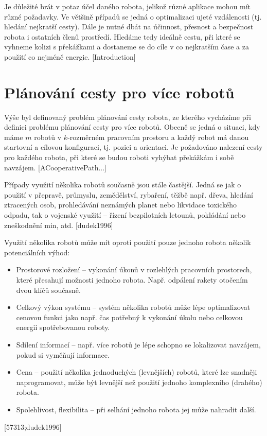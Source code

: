 Je důležité brát v potaz účel daného robota, jelikož různé aplikace mohou mít různé požadavky. Ve většině případů se jedná o optimalizaci ujeté vzdálenosti (tj. hledání nejkratší cesty). Dále je nutné dbát na účinnost, přesnost a bezpečnost robota i ostatních členů prostředí. Hledáme tedy ideálně cestu, při které se vyhneme kolizi s překážkami a dostaneme se do cíle v co nejkratším čase a za použití co nejméně energie. [Introduction]



\section{Plánování cesty pro více robotů}
Výše byl definovaný problém plánování cesty robota, ze kterého vycházíme při definici problému plánování cesty pro více robotů. Obecně se jedná o situaci, kdy máme $m$ robotů v $k$-rozměrném pracovním prostoru a každý robot má danou startovní a cílovou konfiguraci, tj. pozici a orientaci. Je požadováno nalezení cesty pro každého robota, při které se budou roboti vyhýbat překážkám i sobě navzájem. [ACooperativePath...]

Případy využití několika robotů současně jsou stále častější. Jedná se jak o použití v přepravě, průmyslu, zemědělství, rybaření, těžbě např. dřeva, hledání ztracených osob, prohledávání neznámých planet nebo likvidace toxického odpadu, tak o vojenské využití -- řízení bezpilotních letounů, pokládání nebo zneškodnění min, atd. [dudek1996]

Využití několika robotů může mít oproti použití pouze jednoho robota několik potenciálních výhod:
\begin{itemize}
	\item Prostorové rozložení -- vykonání úkonů v rozlehlých pracovních prostorech, které přesahují možnosti jednoho robota. Např. odpálení rakety otočením dvou klíčů současně.
	\item Celkový výkon systému -- systém několika robotů může lépe optimalizovat cenovou funkci jako např. čas potřebný k vykonání úkolu nebo celkovou energii spotřebovanou roboty.
	\item Sdílení informací -- např. více robotů je lépe schopno se lokalizovat navzájem, pokud si vyměňují informace.
	\item Cena -- použití několika jednoduchých (levnějších) robotů, které lze snadněji naprogramovat, může být levnější než použití jednoho komplexního (drahého) robota.
	\item Spolehlivost, flexibilita -- při selhání jednoho robota jej může nahradit další.
\end{itemize}
[57313;dudek1996]


